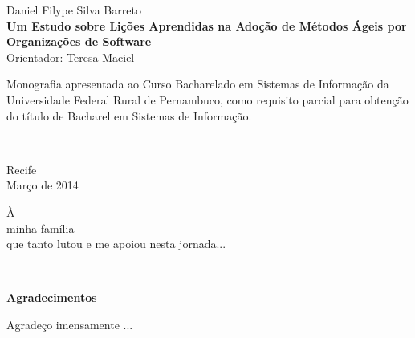 %
\hyphenation{}

\vspace*{0.0cm}
{\center
{\Large Daniel Filype Silva Barreto}\\[2.4cm]
{\huge \bf Um Estudo sobre Lições Aprendidas na Adoção de Métodos Ágeis por Organizações de Software}\\[2.0cm]
{\Large Orientador: Teresa Maciel}}\\[2.0cm]

{\raggedleft
\begin{minipage}[t]{8.3cm}
\setlength{\baselineskip}{0.25in}
Monografia apresentada ao Curso Bacharelado em Sistemas de Informação  da Universidade Federal Rural de Pernambuco, como requisito parcial para obtenção do título de Bacharel em Sistemas de Informação.\end{minipage}\\[2cm]}
\vspace{3cm}
{\center Recife \\[3mm]
Março de 2014 \\}

\newpage
\vspace*{18cm}
{\raggedleft
\begin{minipage}[t]{6.0cm}
\setlength{\baselineskip}{0.25in}
À\\
minha família\\
que tanto lutou e me apoiou nesta jornada...\\
\end{minipage}\\[2cm]}



\newpage
\begin{center}
{\Large \bf Agradecimentos}
\end{center}
\vspace*{-0.06in}

Agradeço imensamente ...


